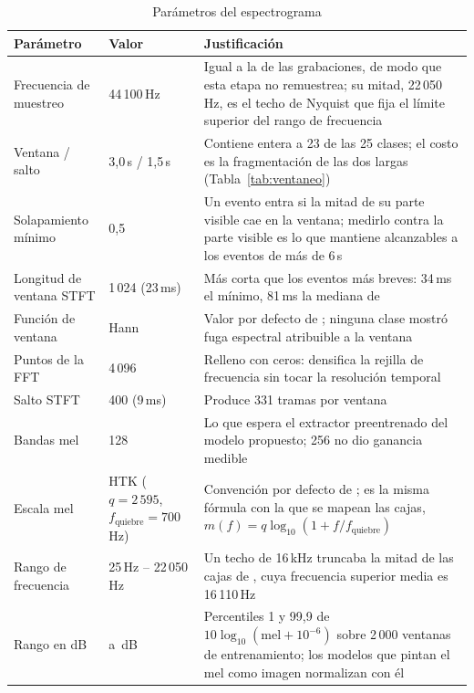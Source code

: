 \documentclass[12pt,a4paper]{article}
\begin{document}
\begin{table}[htbp]
    \centering
    \caption{Parámetros del espectrograma}
    \label{tab:preproc}
    \small
    \begin{tabular}{@{}L{2.6cm}L{3.0cm}L{8.3cm}@{}}
        \toprule
        \textbf{Parámetro} & \textbf{Valor} & \textbf{Justificación} \\
        \midrule
        Frecuencia de muestreo & 44\,100\,Hz & Igual a la de las grabaciones, de modo que esta etapa no remuestrea; su mitad, 22\,050\,Hz, es el techo de Nyquist que fija el límite superior del rango de frecuencia \\
        \addlinespace
        Ventana / salto & 3,0\,s / 1,5\,s & Contiene entera a 23 de las 25 clases; el costo es la fragmentación de las dos largas (Tabla~\ref{tab:ventaneo}) \\
        \addlinespace
        Solapamiento mínimo & 0,5 & Un evento entra si la mitad de su parte visible cae en la ventana; medirlo contra la parte visible es lo que mantiene alcanzables a los eventos de más de 6\,s \\
        \addlinespace
        Longitud de ventana STFT & 1\,024 (23\,ms) & Más corta que los eventos más breves: 34\,ms el mínimo, 81\,ms la mediana de  \\
        \addlinespace
        Función de ventana & Hann & Valor por defecto de ; ninguna clase mostró fuga espectral atribuible a la ventana \\
        \addlinespace
        Puntos de la FFT & 4\,096 & Relleno con ceros: densifica la rejilla de frecuencia sin tocar la resolución temporal \\
        \addlinespace
        Salto STFT & 400 (9\,ms) & Produce 331 tramas por ventana \\
        \addlinespace
        Bandas mel & 128 & Lo que espera el extractor preentrenado del modelo propuesto; 256 no dio ganancia medible \\
        \addlinespace
        Escala mel & HTK ($q=2\,595$,\newline $f_\text{quiebre}=700$\,Hz) & Convención por defecto de ; es la misma fórmula con la que se mapean las cajas, $m(f) = q \log_{10}(1 + f / f_\text{quiebre})$ \\
        \addlinespace
        Rango de frecuencia & 25\,Hz -- 22\,050\,Hz & Un techo de 16\,kHz truncaba la mitad de las cajas de , cuya frecuencia superior media es 16\,110\,Hz \\
        \addlinespace
        Rango en dB & \dbLow{} a \dbHigh{}\,dB & Percentiles 1 y 99,9 de $10\log_{10}(\text{mel}+10^{-6})$ sobre 2\,000 ventanas de entrenamiento; los modelos que pintan el mel como imagen normalizan con él \\
        \bottomrule
    \end{tabular}
\end{table}
\end{document}
